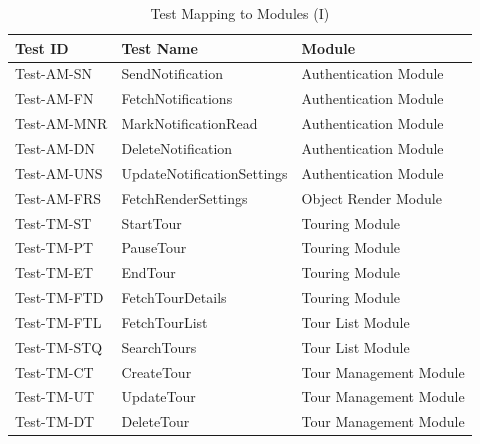 \documentclass[12pt, titlepage]{article}
\begin{document}
\begin{table}[htpb!]
  \centering
  \begin{tabular}{|l|p{6cm}|p{4cm}|}
    \hline
    \textbf{Test ID} & \textbf{Test Name}         & \textbf{Module}        \\
    \hline
    Test-AM-SN       & SendNotification           & Authentication Module  \\
    \hline
    Test-AM-FN       & FetchNotifications         & Authentication Module  \\
    \hline
    Test-AM-MNR      & MarkNotificationRead       & Authentication Module  \\
    \hline
    Test-AM-DN       & DeleteNotification         & Authentication Module  \\
    \hline
    Test-AM-UNS      & UpdateNotificationSettings & Authentication Module  \\
    \hline
    Test-AM-FRS      & FetchRenderSettings        & Object Render Module   \\
    \hline
    Test-TM-ST       & StartTour                  & Touring Module         \\
    \hline
    Test-TM-PT       & PauseTour                  & Touring Module         \\
    \hline
    Test-TM-ET       & EndTour                    & Touring Module         \\
    \hline
    Test-TM-FTD      & FetchTourDetails           & Touring Module         \\
    \hline
    Test-TM-FTL      & FetchTourList              & Tour List Module       \\
    \hline
    Test-TM-STQ      & SearchTours                & Tour List Module       \\
    \hline
    Test-TM-CT       & CreateTour                 & Tour Management Module \\
    \hline
    Test-TM-UT       & UpdateTour                 & Tour Management Module \\
    \hline
    Test-TM-DT       & DeleteTour                 & Tour Management Module \\
    \hline
  \end{tabular}
  \caption{Test Mapping to Modules (I)}
  \label{tab:test_mapping1}
\end{table}
\end{document}
